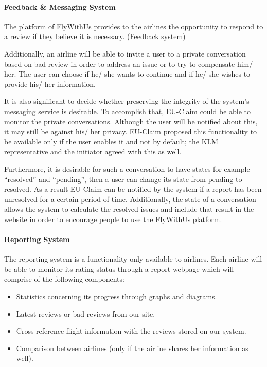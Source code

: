 \paragraph{Feedback \& Messaging System} The platform of FlyWithUs provides to the airlines the opportunity to respond to a review if they believe it is necessary. (Feedback system)

Additionally, an airline will be able to invite a user to a private conversation based on bad review in order to address an issue or to try to compensate him/ her. The user can choose 
if he/ she wants to continue and if he/ she wishes to provide his/ her information.

It is also significant to decide whether preserving the integrity of the system's  messaging service is desirable. To accomplish that, EU-Claim could be able to monitor the private 
conversations. Although the user will be notified about this, it may still be against his/ her privacy. EU-Claim proposed this functionality to be available only if the user enables 
it and not by default; the KLM representative and the initiator agreed with this as well.

Furthermore, it is desirable for such a conversation to have states for example “resolved”  and “pending”, then a user can change its state from pending to resolved. As a result 
EU-Claim can be notified by the system if a report has been unresolved for a certain period of time.  Additionally, the state of a conversation allows the system to calculate the resolved 
issues and include that result in the website in order to encourage people to use the FlyWithUs platform.

\paragraph{Reporting System} The reporting system is a functionality only available to airlines. Each airline will be able to monitor its rating status through a report webpage which will comprise of the following components:
\begin{itemize}
\item Statistics concerning its progress through graphs and diagrams.
\item Latest reviews or bad reviews from our site.
\item Cross-reference flight information with the reviews stored on our system.
\item Comparison between airlines (only if the airline shares her information as well).
\end{itemize}


